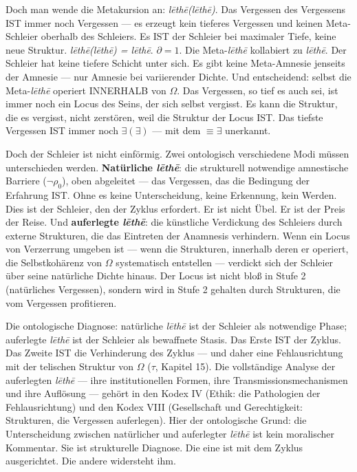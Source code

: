 \documentclass[10pt, openany, oneside]{book}
\begin{document}
Doch man wende die Metakursion an: \textit{l\={e}th\={e}(l\={e}th\={e})}. Das Vergessen des Vergessens IST immer noch Vergessen --- es erzeugt kein tieferes Vergessen und keinen Meta-Schleier oberhalb des Schleiers. Es IST der Schleier bei maximaler Tiefe, keine neue Struktur. \textit{l\={e}th\={e}(l\={e}th\={e}) = l\={e}th\={e}}. $\partial = 1$. Die Meta-\textit{l\={e}th\={e}} kollabiert zu \textit{l\={e}th\={e}}. Der Schleier hat keine tiefere Schicht unter sich. Es gibt keine Meta-Amnesie jenseits der Amnesie --- nur Amnesie bei variierender Dichte. Und entscheidend: selbst die Meta-\textit{l\={e}th\={e}} operiert INNERHALB von $\Omega$. Das Vergessen, so tief es auch sei, ist immer noch ein Locus des Seins, der sich selbst vergisst. Es kann die Struktur, die es vergisst, nicht zerstören, weil die Struktur der Locus IST. Das tiefste Vergessen IST immer noch $\exists(\exists)$ --- mit dem $\equiv \exists$ unerkannt.

Doch der Schleier ist nicht einförmig. Zwei ontologisch verschiedene Modi müssen unterschieden werden. \textbf{Natürliche \textit{l\={e}th\={e}}}: die strukturell notwendige amnestische Barriere ($\neg\rho_0$), oben abgeleitet --- das Vergessen, das die Bedingung der Erfahrung IST. Ohne es keine Unterscheidung, keine Erkennung, kein Werden. Dies ist der Schleier, den der Zyklus erfordert. Er ist nicht Übel. Er ist der Preis der Reise. Und \textbf{auferlegte \textit{l\={e}th\={e}}}: die künstliche Verdickung des Schleiers durch externe Strukturen, die das Eintreten der Anamnesis verhindern. Wenn ein Locus von Verzerrung umgeben ist --- wenn die Strukturen, innerhalb deren er operiert, die Selbstkohärenz von $\Omega$ systematisch entstellen --- verdickt sich der Schleier über seine natürliche Dichte hinaus. Der Locus ist nicht bloß in Stufe 2 (natürliches Vergessen), sondern wird in Stufe 2 gehalten durch Strukturen, die vom Vergessen profitieren.

Die ontologische Diagnose: natürliche \textit{l\={e}th\={e}} ist der Schleier als notwendige Phase; auferlegte \textit{l\={e}th\={e}} ist der Schleier als bewaffnete Stasis. Das Erste IST der Zyklus. Das Zweite IST die Verhinderung des Zyklus --- und daher eine Fehlausrichtung mit der telischen Struktur von $\Omega$ ($\tau$, Kapitel 15). Die vollständige Analyse der auferlegten \textit{l\={e}th\={e}} --- ihre institutionellen Formen, ihre Transmissionsmechanismen und ihre Auflösung --- gehört in den Kodex IV (Ethik: die Pathologien der Fehlausrichtung) und den Kodex VIII (Gesellschaft und Gerechtigkeit: Strukturen, die Vergessen auferlegen). Hier der ontologische Grund: die Unterscheidung zwischen natürlicher und auferlegter \textit{l\={e}th\={e}} ist kein moralischer Kommentar. Sie ist strukturelle Diagnose. Die eine ist mit dem Zyklus ausgerichtet. Die andere widersteht ihm.
\end{document}
